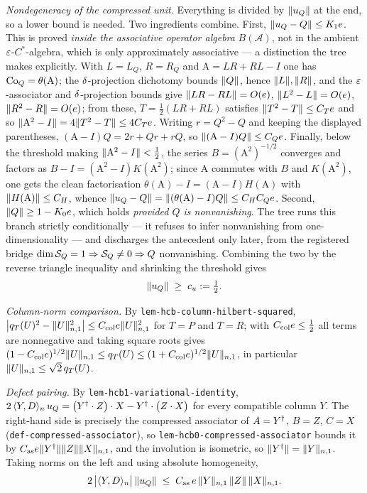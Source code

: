 \emph{Nondegeneracy of the compressed unit.} Everything is divided by
$\lVert u_{Q}\rVert$ at the end, so a lower bound is needed. Two ingredients combine. First,
$\lVert u_{Q}-Q\rVert\le K_1e$. This is proved \emph{inside the associative operator
algebra} $B(\mathcal A)$, not in the ambient $\varepsilon$-$C^*$-algebra, which is only
approximately associative --- a distinction the tree makes explicitly. With $L=L_Q$,
$R=R_Q$ and $\mathrm A=LR+RL-I$ one has $\mathrm{Co}_{Q}=\theta(\mathrm A)$; the
$\delta$-projection dichotomy bounds $\lVert Q\rVert$, hence $\lVert L\rVert,\lVert R\rVert$, and the
$\varepsilon$-associator and $\delta$-projection bounds give
$\lVert LR-RL\rVert=O(e)$, $\lVert L^{2}-L\rVert=O(e)$, $\lVert R^{2}-R\rVert=O(e)$; from these,
$T=\tfrac12(LR+RL)$ satisfies $\lVert T^{2}-T\rVert\le C_Te$ and so
$\lVert \mathrm A^{2}-I\rVert=4\lVert T^{2}-T\rVert\le4C_Te$. Writing $r=Q^{2}-Q$ and keeping the
displayed parentheses, $(\mathrm A-I)Q=2r+Qr+rQ$, so $\lVert (\mathrm A-I)Q\rVert\le C_Qe$.
Finally, below the threshold making $\lVert \mathrm A^{2}-I\rVert<\tfrac12$, the series
$B=(\mathrm A^{2})^{-1/2}$ converges and factors as $B-I=(\mathrm A^{2}-I)K(\mathrm A^{2})$;
since $\mathrm A$ commutes with $B$ and $K(\mathrm A^{2})$, one gets the clean
factorisation $\theta(\mathrm A)-I=(\mathrm A-I)H(\mathrm A)$ with
$\lVert H(\mathrm A)\rVert\le C_H$, whence
$\lVert u_{Q}-Q\rVert=\lVert (\theta(\mathrm A)-I)Q\rVert\le C_HC_Qe$.
Second, $\lVert Q\rVert\ge1-K_0e$, which holds \emph{provided $Q$ is nonvanishing}. The tree
runs this branch strictly conditionally --- it refuses to infer nonvanishing from
one-dimensionality --- and discharges the antecedent only later, from the registered
bridge $\dim\mathcal S_{Q}=1\Rightarrow\mathcal S_{Q}\ne0\Rightarrow Q$ nonvanishing. Combining the
two by the reverse triangle inequality and shrinking the threshold gives
\begin{equation}\label{eq:ca-cu}
  \lVert u_{Q}\rVert\;\ge\;c_u:=\tfrac12 .
\end{equation}

\emph{Column-norm comparison.} By \texttt{lem-hcb-column-hilbert-squared},
$\bigl\lvert q_{T}(U)^{2}-\lVert U\rVert_{n,1}^{2}\bigr\rvert\le C_{\mathrm{col}}e\lVert U\rVert_{n,1}^{2}$
for $T=P$ and $T=R$; with $C_{\mathrm{col}}e\le\tfrac12$ all terms are nonnegative and
taking square roots gives
$(1-C_{\mathrm{col}}e)^{1/2}\lVert U\rVert_{n,1}\le q_{T}(U)\le(1+C_{\mathrm{col}}e)^{1/2}\lVert U\rVert_{n,1}$,
in particular $\lVert U\rVert_{n,1}\le\sqrt2\,q_{T}(U)$.

\emph{Defect pairing.} By \texttt{lem-hcb1-variational-identity},
$2\,\langle Y,D\rangle_{n}\,u_{Q}=\bigl(Y^{\dagger}\mathbin{\cdot} Z\bigr)\mathbin{\cdot} X-Y^{\dagger}\mathbin{\cdot}\bigl(Z\mathbin{\cdot} X\bigr)$ for
every compatible column $Y$. The right-hand side is precisely the compressed associator
of $A=Y^{\dagger}$, $B=Z$, $C=X$ (\texttt{def-compressed-associator}), so
\texttt{lem-hcb0-compressed-associator} bounds it by
$C_{\mathrm{as}}e\lVert Y^{\dagger}\rVert\lVert Z\rVert\lVert X\rVert_{n,1}$, and the involution is isometric, so
$\lVert Y^{\dagger}\rVert=\lVert Y\rVert_{n,1}$. Taking norms on the left and using absolute homogeneity,
\begin{equation}\label{eq:ca-pairing}
  2\,\bigl\lvert\langle Y,D\rangle_{n}\bigr\rvert\,\lVert u_{Q}\rVert
  \;\le\;C_{\mathrm{as}}\,e\,\lVert Y\rVert_{n,1}\,\lVert Z\rVert\,\lVert X\rVert_{n,1}.
\end{equation}

